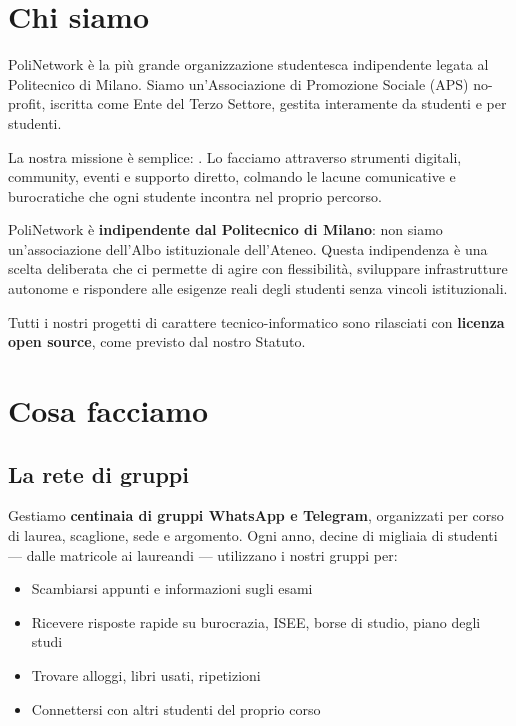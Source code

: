 \documentclass[report]{core/polinetwork}
\begin{document}
\pnMakeTitlePage


\section{Chi siamo}

PoliNetwork è la più grande organizzazione studentesca indipendente
legata al Politecnico di Milano. Siamo un'Associazione di Promozione
Sociale (APS) no-profit, iscritta come Ente del Terzo Settore,
gestita interamente da studenti e per studenti.

La nostra missione è semplice: . Lo facciamo attraverso
strumenti digitali, community, eventi e supporto diretto, colmando
le lacune comunicative e burocratiche che ogni studente incontra nel
proprio percorso.

PoliNetwork è \textbf{indipendente dal Politecnico di Milano}: non
siamo un'associazione dell'Albo istituzionale dell'Ateneo.
Questa indipendenza è una scelta deliberata che ci permette di agire
con flessibilità, sviluppare infrastrutture autonome e rispondere
alle esigenze reali degli studenti senza vincoli istituzionali.

Tutti i nostri progetti di carattere tecnico-informatico sono
rilasciati con \textbf{licenza open source}, come previsto dal
nostro Statuto.

\section{Cosa facciamo}

\subsection{La rete di gruppi}

Gestiamo \textbf{centinaia di gruppi WhatsApp e Telegram}, organizzati
per corso di laurea, scaglione, sede e argomento. Ogni anno, decine di
migliaia di studenti --- dalle matricole ai laureandi --- utilizzano i
nostri gruppi per:

\begin{itemize}
  \item Scambiarsi appunti e informazioni sugli esami
  \item Ricevere risposte rapide su burocrazia, ISEE, borse di studio,
    piano degli studi
  \item Trovare alloggi, libri usati, ripetizioni
  \item Connettersi con altri studenti del proprio corso
\end{itemize}
\end{document}
